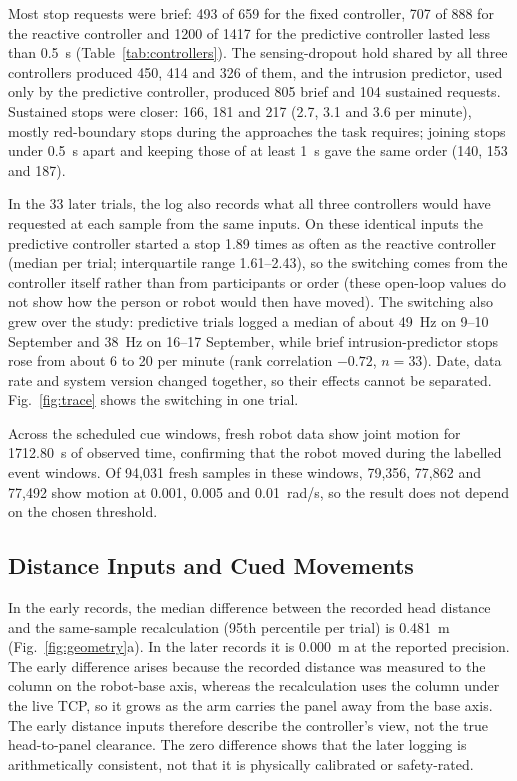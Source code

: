 \documentclass{IEEEtran}
\newcommand{\aidraft}[1]{#1}
\begin{document}


\aidraft{Most stop requests were brief: 493 of 659 for the fixed controller, 707 of
888 for the reactive controller and 1200 of 1417 for the predictive controller
lasted less than 0.5~s (Table~\ref{tab:controllers}). The sensing-dropout
hold shared by all three controllers produced 450, 414 and 326 of them, and the
intrusion predictor, used only by the predictive controller, produced 805 brief
and 104 sustained requests. Sustained stops were closer: 166, 181 and 217 (2.7,
3.1 and 3.6 per minute), mostly red-boundary stops during the approaches the
task requires; joining stops under 0.5~s apart and keeping those of at least
1~s gave the same order (140, 153 and 187).

In the 33 later trials, the log also records what all three controllers would
have requested at each sample from the same inputs. On these identical inputs
the predictive controller started a stop 1.89 times as often as the reactive
controller (median per trial; interquartile range 1.61--2.43), so the
switching comes from the controller itself rather than from participants or
order (these open-loop values do not show how the person or robot would then
have moved). The switching also grew over the study: predictive trials logged a median of about 49~Hz on 9--10 September
and 38~Hz on 16--17 September, while brief intrusion-predictor stops rose from
about 6 to 20 per minute (rank correlation $-0.72$, $n=33$). Date, data rate
and system version changed together, so their effects cannot be separated.
Fig.~\ref{fig:trace} shows the switching in one trial.}

Across the scheduled cue windows, fresh robot data show joint motion for
1712.80~s of observed time, confirming that the robot moved during the labelled
event windows. Of 94,031 fresh samples in these windows, 79,356, 77,862 and
77,492 show motion at 0.001, 0.005 and 0.01~rad/s, so the result does not
depend on the chosen threshold.

\subsection{Distance Inputs and Cued Movements}
In the early records, the median difference between the recorded head distance
and the same-sample recalculation (95th percentile per trial) is 0.481~m
(Fig.~\ref{fig:geometry}a). In the later records it is 0.000~m at the reported
precision. The early difference arises because the recorded distance was
measured to the column on the robot-base axis, whereas the recalculation uses
the column under the live TCP, so it grows as the arm carries the panel away
from the base axis. The early distance inputs therefore describe the
controller's view, not the true head-to-panel clearance. The zero difference
shows that the later logging is arithmetically consistent, not
that it is physically calibrated or safety-rated.
\end{document}
